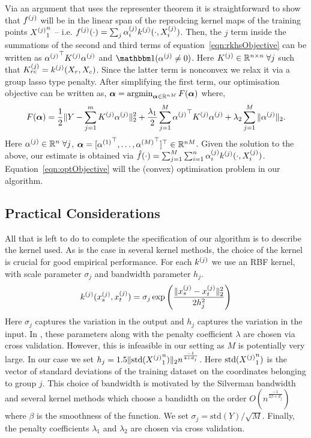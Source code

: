 Via an argument that uses the representer theorem it is straightforward to show
that $f^{(j)}$ will be in the linear span of the reprodcing kernel maps of the
training points ${X^{(j)}}_1^n$ -- i.e. $f^{(j)}(\cdot) = 
\sum_j \alpha^{(j)}_i k^{(j)}(\cdot, X^{(j)}_i) $.
Then, the $j$ term inside the summations of the second and third
terms of equation~\eqref{eqn:rkhsObjective} can be written as 
${\alpha^{(j)}}^\top K^{(j)} \alpha^{(j)}$ and $\indfone(\alphaj \neq 0)$.
Here $K^{(j)} \in \mathbb{R}^{n\times n}\; \forall
j$ such that $K^{(j)}_{rc} = k^{(j)}(X_r, X_c)$.
Since the latter term is nonconvex we relax it via a group lasso type penalty.
After simplifying the first term, our optimisation objective can be written as,
${\bm{\alpha}} = \mathop{\mathrm{argmin}}_{{\bm{\alpha}} \in \mathbb{R}^{nM}} F({\bm{\alpha}})$ where,
\begin{equation}
F({\bm{\alpha}}) = \frac{1}{2}\|Y - \sum_{j=1}^m K^{(j)} \alpha^{(j)}\|_2^2 + 
  \frac{\lambda_1}{2} \sum_{j=1}^M {\alpha^{(j)}}^\top K^{(j)} \alpha^{(j)} +
  \lambda_2 \sum_{j=1}^M \| \alpha^{(j)} \|_2.
\label{eqn:optObjective}
\end{equation}
Here $\alpha^{(j)} \in \mathbb{R}^n \; \forall j$, ${\bm{\alpha}} = [{\alpha^{(1)}}^\top, \dots, 
{\alpha^{(M)}}^\top]^\top  \in\mathbb{R}^{nM}$. Given the solution to the above, our
estimate is obtained via $\hat{f}(\cdot) = \sum_{j=1}^M \sum_{i=1}^n \alpha^{(j)}_i
k^{(j)}(\cdot, X^{(j)}_i)$.
Equation~\eqref{eqn:optObjective} will the (convex) optimisation problem in our
algorithm.

\subsection{Practical Considerations}

All that is left to do to complete the specification of our algorithm is to
describe the kernel used. As is the case in several kernel methods, the choice
of the kernel is crucial for good empirical performance.
For each $k^{(j)}$ we use an RBF kernel, with scale parameter $\sigma_j$
and bandwidth parameter $h_j$.
\[
k^{(j)}(x^{(j)}_s, x^{(j)}_t) = \sigma_j \exp \left( \frac{\|x^{(j)}_s -x^{(j)}_t\|_2^2 } 
  {2h_j^2} \right)
\]
Here $\sigma_j$ captures the variation in the output and $h_j$ captures the
variation in the input.
In \krrs , these parameters along with the penalty coefficient $\lambda$ are
chosen via cross validation.
However, this is infeasible in our setting as $M$ is potentially very large. 
In our case we set $h_j = 1.5 \| \textrm{std}({X^{(j)}}_1^n) \|_2 n^{\frac{-1}{4+d_j}}$.
Here $\textrm{std}({X^{(j)}}_1^n)$ is the vector of standard deviations of the training
dataset on the coordinates belonging to group $j$. This choice of bandwidth is
motivated by the Silverman bandwidth and several kernel methods which choose 
a bandidth on the order $O(n^{\frac{-1}{2\beta+d_j}})$  where $\beta$ is the
smoothness of the function. We set $\sigma_j = \textrm{std}(Y) / \sqrt{M}$.
Finally, the penalty coefficients $\lambda_1$ and $\lambda_2$ are chosen via cross
validation.

